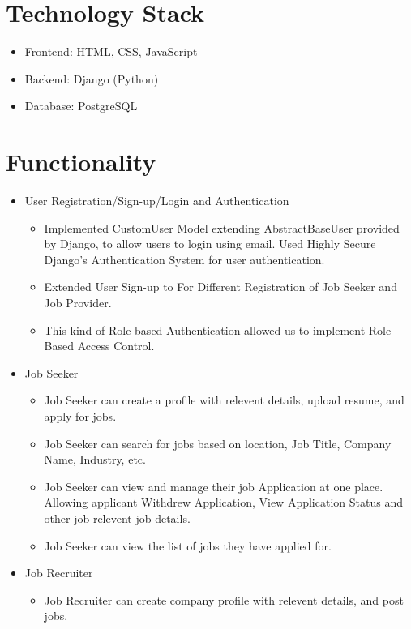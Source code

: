 \documentclass[12pt]{article}
\begin{document}
\section*{Technology Stack}
\begin{itemize}
    \item Frontend: HTML, CSS, JavaScript
    \item Backend: Django (Python)
    \item Database: PostgreSQL
\end{itemize}

\section*{Functionality}
\begin{itemize}
    \item User Registration/Sign-up/Login and Authentication
    \begin{itemize}
        \item Implemented CustomUser Model extending AbstractBaseUser provided by Django, to allow users to login using email. Used Highly Secure Django's Authentication System for user authentication.
        \item Extended User Sign-up to For Different Registration of Job Seeker and Job Provider.
        \item This kind of Role-based Authentication allowed us to implement Role Based Access Control.
    \end{itemize}
    \item Job Seeker
    \begin{itemize}
        \item Job Seeker can create a profile with relevent details, upload resume, and apply for jobs.
        \item Job Seeker can search for jobs based on location, Job Title, Company Name, Industry, etc.
        \item Job Seeker can view and manage their job Application at one place. Allowing applicant Withdrew Application, View Application Status and other job relevent job details.
        \item Job Seeker can view the list of jobs they have applied for.
    \end{itemize}
    \item Job Recruiter
    \begin{itemize}
        \item Job Recruiter can create company profile with relevent details, and post jobs.

\end{itemize}
\end{itemize}
\end{document}
